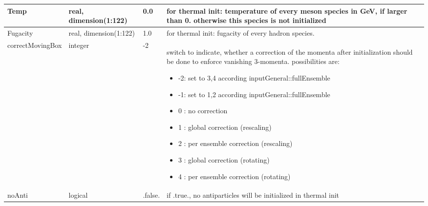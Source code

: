 \documentclass{article}
\begin{document}
\begin{longtable}{llll}
\midrule
Temp & \begin{minipage}[t]{2cm}real, dimension(1:122)\end{minipage} & \begin{minipage}[t]{2cm}0.0\end{minipage} & \begin{minipage}[t]{12cm}for thermal init: temperature of every meson species in GeV, if larger than 0. otherwise this species is not initialized\end{minipage}\\*
\midrule
Fugacity & \begin{minipage}[t]{2cm}real, dimension(1:122)\end{minipage} & \begin{minipage}[t]{2cm}1.0\end{minipage} & \begin{minipage}[t]{12cm}for thermal init: fugacity of every hadron species.\end{minipage}\\*
\midrule
correctMovingBox & \begin{minipage}[t]{2cm}integer\end{minipage} & \begin{minipage}[t]{2cm}-2\end{minipage} & \begin{minipage}[t]{12cm}switch to indicate, whether a correction of the momenta after initialization should be done to enforce vanishing 3-momenta. possibilities are:\begin{itemize}\leftmargin0em\itemindent0pt\item -2: set to 3,4 according inputGeneral::fullEnsemble\item -1: set to 1,2 according inputGeneral::fullEnsemble\item 0 : no correction\item 1 : global correction (rescaling)\item 2 : per ensemble correction (rescaling)\item 3 : global correction (rotating)\item 4 : per ensemble correction (rotating)\end{itemize}\end{minipage}\\*
\midrule
noAnti & \begin{minipage}[t]{2cm}logical\end{minipage} & \begin{minipage}[t]{2cm}.false.\end{minipage} & \begin{minipage}[t]{12cm}if .true., no antiparticles will be initialized in thermal init\end{minipage}\\*

\end{longtable}
\end{document}
